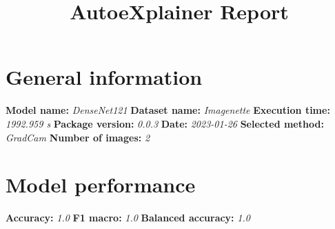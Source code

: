 \documentclass{article}%
\title{AutoeXplainer Report}%
\date{}%
\begin{document}
%
\normalsize%
\maketitle%
\section*{General information}%
\label{sec:Generalinformation}%
\textbf{Model name: }%
\textit{DenseNet121 \newline%
}%
\textbf{Dataset name: }%
\textit{Imagenette \newline%
}%
\textbf{Execution time: }%
\textit{1992.959 s \newline%
}%
\textbf{Package version: }%
\textit{0.0.3 \newline%
}%
\textbf{Date: }%
\textit{2023{-}01{-}26 \newline%
}%
\textbf{Selected method: }%
\textit{GradCam \newline%
}%
\textbf{Number of images: }%
\textit{2}

%
\section*{Model performance}%
\label{sec:Modelperformance}%
\textbf{Accuracy: }%
\textit{1.0 \newline%
}%
\textbf{F1 macro: }%
\textit{1.0 \newline%
}%
\textbf{Balanced accuracy: }%
\textit{1.0 \newline%
}

%
\end{document}
